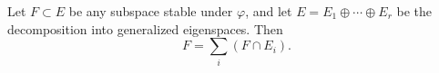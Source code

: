 Let $F \subset E$ be any subspace stable under $\varphi$, and let $E = E_1 \oplus \cdots \oplus E_r$ be the decomposition into generalized eigenspaces. Then
$$F = \sum_i (F \cap E_i).$$
